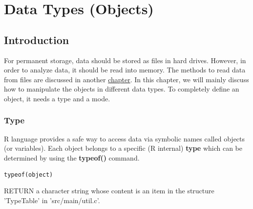 
\chapter{Data Types (Objects)}
\label{chap:data-types}

\section{Introduction}
\label{sec:introduction}


For permanent storage, data should be stored as files in hard
drives. However, in order to analyze data, it should be read into
memory. The methods to read data from files are discussed in another
\hyperref[chap:files]{chapter}. In this chapter, we will mainly discuss
how to manipulate the objects in different data types.
To completely define an object, it needs a type and a mode. 

\subsection{Type}
\label{sec:type}

R language provides a safe way to access data via symbolic names
called objects (or variables). Each object belongs to a specific (R
internal) {\bf type} which can be determined by using the
{\bf typeof()} command.

\begin{lstlisting}
typeof(object)
\end{lstlisting}
RETURN a character string whose content is an item in the structure
'TypeTable' in 'src/main/util.c'. 


